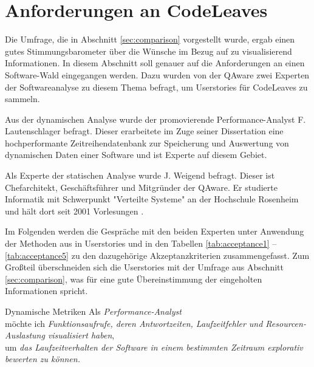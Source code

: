 \section{Anforderungen an CodeLeaves}
\label{sec:requirements}

Die Umfrage, die in Abschnitt \ref{sec:comparison} vorgestellt wurde, ergab einen gutes Stimmungsbarometer über die Wünsche im Bezug auf zu visualisierend Informationen. In diesem Abschnitt soll genauer auf die Anforderungen an einen Software-Wald eingegangen werden. Dazu wurden von der QAware zwei Experten der Softwareanalyse zu diesem Thema befragt, um Userstories für CodeLeaves zu sammeln.

Aus der dynamischen Analyse wurde der promovierende Performance-Analyst F. Lautenschlager befragt. Dieser erarbeitete im Zuge seiner Dissertation eine hochperformante Zeitreihendatenbank zur Speicherung und Auswertung von dynamischen Daten einer Software und ist Experte auf diesem Gebiet.

Als Experte der statischen Analyse wurde J. Weigend befragt. Dieser ist Chefarchitekt, Geschäftsführer und Mitgründer der QAware. Er studierte Informatik mit Schwerpunkt "Verteilte Systeme" an der Hochschule Rosenheim und hält dort seit 2001 Vorlesungen \cite{qaware2017johannes}.

Im Folgenden werden die Gespräche mit den beiden Experten unter Anwendung der Methoden aus \cite{cohn2004user} in Userstories und in den Tabellen \ref{tab:acceptance1} -- \ref{tab:acceptance5} zu den dazugehörige Akzeptanzkriterien zusammengefasst. Zum Großteil überschneiden sich die Userstories mit der Umfrage aus Abschnitt \ref{sec:comparison}, was für eine gute Übereinstimmung der eingeholten Informationen spricht.

\begin{userstory}{Dynamische Metriken}
  Als \textit{Performance-Analyst}\\
  möchte ich \textit{Funktionsaufrufe, deren Antwortzeiten, Laufzeitfehler und Resourcen-Auslastung visualisiert haben},\\
  um \textit{das Laufzeitverhalten der Software in einem bestimmten Zeitraum explorativ bewerten zu können.}
\end{userstory}

